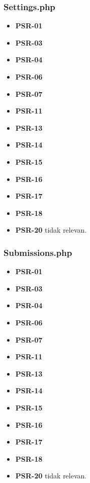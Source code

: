 \subsubsection{Settings.php}
\begin{itemize}
	\item \textbf{PSR-01} 
	\item \textbf{PSR-03}
	\item \textbf{PSR-04}
	\item \textbf{PSR-06}
	\item \textbf{PSR-07}
	\item \textbf{PSR-11}
	\item \textbf{PSR-13}
	\item \textbf{PSR-14}
	\item \textbf{PSR-15}
	\item \textbf{PSR-16}
	\item \textbf{PSR-17} 
	\item \textbf{PSR-18} 
	\item \textbf{PSR-20} tidak relevan.
\end{itemize}

\subsubsection{Submissions.php}
\begin{itemize}
	\item \textbf{PSR-01} 
	\item \textbf{PSR-03}
	\item \textbf{PSR-04}
	\item \textbf{PSR-06}
	\item \textbf{PSR-07}
	\item \textbf{PSR-11}
	\item \textbf{PSR-13}
	\item \textbf{PSR-14}
	\item \textbf{PSR-15}
	\item \textbf{PSR-16}
	\item \textbf{PSR-17} 
	\item \textbf{PSR-18} 
	\item \textbf{PSR-20} tidak relevan.
\end{itemize}

